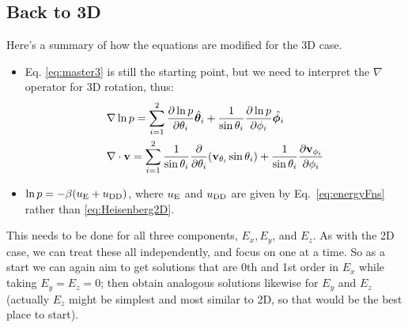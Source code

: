 \documentclass[11pt,reqno]{amsart}
\begin{document}
\subsection{Back to 3D}
Here's a summary of how the equations are modified for the 3D case.
\begin{itemize}
\item Eq. \eqref{eq:master3} is still the starting point, but we need to interpret the $\nabla$ operator for 3D rotation, thus:
\begin{subequations}
\label{eq:del3D}
\begin{align}
&\nabla \ln p =\sum_{i=1}^2 \frac{\partial \ln p}{\partial \theta_i} \hat {\boldsymbol \theta}_i + \frac{1}{\sin\theta_i}\frac{\partial \ln p}{\partial \phi_i}\hat{\boldsymbol \phi_i}\\
&\nabla \cdot {\bf v} = \sum_{i=1}^2 \frac{1}{\sin\theta_i}\frac{\partial}{\partial \theta_i}({\bf v}_{\theta_i}\sin\theta_i) + \frac{1}{\sin\theta_i}\frac{\partial {\bf v}_{\phi_i}}{\partial \phi_i}
\end{align}
\end{subequations}
\item $\ln p = -\beta (u_{\rm E} + u_{\rm DD})$, where $u_{\rm E}$ and $u_{\rm DD}$ are given by Eq.~\eqref{eq:energyFns} rather than \eqref{eq:Heisenberg2D}.
\end{itemize}

This needs to be done for all three components, $E_x, E_y$, and $E_z$. As with the 2D case, we can treat these all independently, and focus on one at a time.  So as a start we can again aim to get solutions that are 0th and 1st order in $E_x$ while taking $E_y = E_z = 0$; then obtain analogous solutions likewise for $E_y$ and $E_z$ (actually $E_z$ might be simplest and most similar to 2D, so that would be the best place to start).
\end{document}
